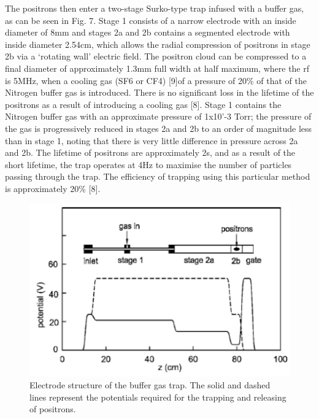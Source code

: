 The positrons then enter a two-stage Surko-type trap infused with a buffer gas, as can be seen in Fig. 7. Stage 1 consists of a narrow electrode with an inside diameter of 8mm and stages 2a and 2b contains a segmented electrode with inside diameter 2.54cm, which allows the radial compression of positrons in stage 2b via a ‘rotating wall’ electric field. The positron cloud can be compressed to a final diameter of approximately 1.3mm full width at half maximum, where the rf is 5MHz, when a cooling gas (SF6 or CF4) [9]of a pressure of 20\% of that of the Nitrogen buffer gas is introduced. There is no significant loss in the lifetime of the positrons as a result of introducing a cooling gas [8].  
Stage 1 contains the Nitrogen buffer gas with an approximate pressure of 1x10'-3 Torr; the pressure of the gas is progressively reduced in stages 2a and 2b to an order of magnitude less than in stage 1, noting that there is very little difference in pressure across 2a and 2b. The lifetime of positrons are approximately 2s, and as a result of the short lifetime, the trap operates at 4Hz to maximise the number of particles passing through the trap. The efficiency of trapping using this particular method is approximately 20\% [8].

\begin{figure}[h]
\centering
\includegraphics{Figures/C2F7}
\decoRule
\caption[C2F7]{Electrode structure of the buffer gas trap. The solid and dashed lines represent the potentials required for the trapping and releasing of positrons.}
\label{fig:C2F7}
\end{figure}

